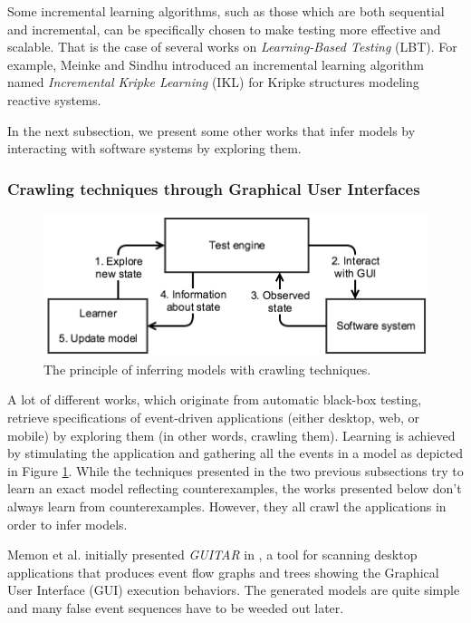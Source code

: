 Some incremental learning algorithms, such as those which are
both sequential and incremental, can be specifically chosen to
make testing more effective and scalable. That is the case of
several works on \textit{Learning-Based Testing} (LBT). For
example, Meinke and Sindhu \cite{tap2011} introduced an
incremental learning algorithm named \textit{Incremental Kripke
Learning} (IKL) for Kripke structures modeling reactive systems.

In the next subsection, we present some other works that infer
models by interacting with software systems by exploring them.

\subsubsection{Crawling techniques through Graphical User Interfaces}
\label{sec:active-crawling}

\begin{figure}[ht]
    \begin{center}
        \includegraphics[width=0.9\linewidth]{figures/crawler.png}
    \end{center}

    \caption{The principle of inferring models with crawling
    techniques.}
    \label{fig:crawler}
\end{figure}

A lot of different works, which originate from automatic
black-box testing, retrieve specifications of event-driven
applications (either desktop, web, or mobile) by exploring them
(in other words, crawling them). Learning is achieved by
stimulating the application and gathering all the events in a
model as depicted in Figure \ref{fig:crawler}. While the
techniques presented in the two previous subsections try to learn an
exact model reflecting counterexamples, the works presented below
don't always learn from counterexamples. However, they all crawl
the applications in order to infer models.

Memon et al. initially presented \textit{GUITAR} in
\cite{Memon:2003}, a tool for scanning desktop applications that
produces event flow graphs and trees showing the Graphical User
Interface (GUI) execution behaviors. The generated models are
quite simple and many false event sequences have to be weeded out
later.

